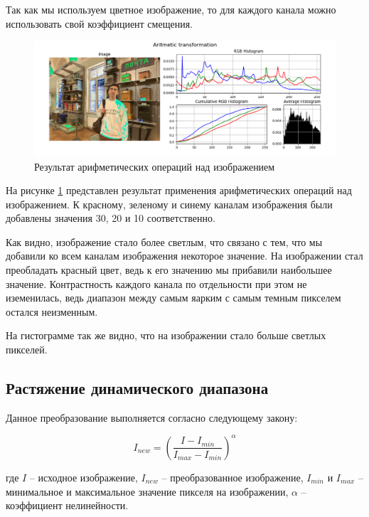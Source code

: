 Так как мы используем цветное изображение, то для каждого канала можно использовать свой коэффициент смещения.

\begin{figure}[H]
    \centering
    \includegraphics[width=\textwidth]{../results/Aritmetic transformation.png}
    \caption{Результат арифметических операций над изображением}
    \label{fig:aritmetic}
\end{figure}

На рисунке \ref{fig:aritmetic} представлен результат применения арифметических операций над изображением. К красному, зеленому и синему каналам изображения были добавлены значения 30, 20 и 10 соответственно.

Как видно, изображение стало более светлым, что связано с тем, что мы добавили ко всем каналам изображения некоторое значение. На изображении стал преобладать красный цвет, ведь к его значению мы прибавили наибольшее значение. 
Контрастность каждого канала по отдельности при этом не иземенилась, ведь диапазон между самым яарким с самым темным пикселем остался неизменным. 

На гистограмме так же видно, что на изображении стало больше светлых пикселей. 

\subsection{Растяжение динамического диапазона}

Данное преобразование выполняется согласно следующему закону: 

\begin{equation}
  I_{new} = \left( \frac{I - I_{min}}{I_{max} - I_{min}} \right)^\alpha
\end{equation}

где $I$ -- исходное изображение, $I_{new}$ -- преобразованное изображение, $I_{min}$ и $I_{max}$ -- минимальное и максимальное значение пикселя на изображении, $\alpha$ -- коэффициент нелинейности.

